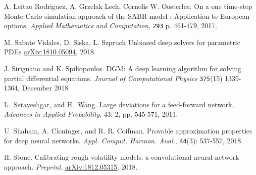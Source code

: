 \documentclass{article}
\theoremstyle{remark}
\begin{document}
\begin{thebibliography}{99}
A. Leitao Rodriguez, A. Grzelak Lech, Cornelis W. Oosterlee.
On a one time-step Monte Carlo simulation approach of the SABR model : Application to European options.
\textit{Applied Mathematics and Computation}, {\tt 293} p. 461-479, 2017,

 M. Sabate Vidales, D. Siska, L. Szpruch
Unbiased deep solvers for parametric PDEs
\href{https://arxiv.org/abs/1810.05094}{arXiv:1810.05094}, 2018.


J. Sirignano and K. Spiliopoulos.
DGM: A deep learning algorithm for solving partial differential equations.
\textit{Journal of Computational Physics}
{\tt 375}(15) 1339-1364, December 2018

 L.~Setayeshgar, and H.~Wang. Large deviations for a feed-forward network, \textit{Advances in Applied Probability}, 43: 2, pp. 545-571, 2011.

U. Shaham, A. Cloninger, and R. R. Coifman. 
Provable approximation properties for deep neural networks. 
\textit{Appl. Comput. Harmon. Anal.}, {\tt 44}(3): 537-557, 2018.

H. Stone. Calibrating rough volatility models: a convolutional neural network approach. \textit{Preprint}, \href{https://arxiv.org/pdf/1812.05315.pdf}{arXiv:1812.05315}, 2018.
\end{thebibliography}
\end{document}
